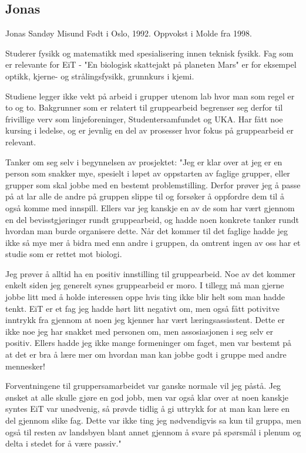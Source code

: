 \subsection*{Jonas}
Jonas Sandøy Misund
Født i Oslo, 1992.
Oppvokst i Molde fra 1998.

Studerer fysikk og matematikk med spesialisering innen teknisk fysikk.
Fag som er relevante for EiT - "En biologisk skattejakt på planeten Mars" er for eksempel optikk, kjerne- og strålingsfysikk, grunnkurs i kjemi.

Studiene legger ikke vekt på arbeid i grupper utenom lab hvor man som regel er to og to.
Bakgrunner som er relatert til gruppearbeid begrenser seg derfor til frivillige verv som linjeforeninger, Studentersamfundet og UKA.
Har fått noe kursing i ledelse, og er jevnlig en del av prosesser hvor fokus på gruppearbeid er relevant.

Tanker om seg selv i begynnelsen av prosjektet:
"Jeg er klar over at jeg er en person som snakker mye, spesielt i løpet av oppstarten av faglige grupper, eller grupper som skal jobbe med en bestemt problemstilling.
Derfor prøver jeg å passe på at lar alle de andre på gruppen slippe til og forsøker å oppfordre dem til å også komme med innspill.
Ellers var jeg kanskje en av de som har vært gjennom en del bevisstgjøringer rundt gruppearbeid, og hadde noen konkrete tanker rundt hvordan man burde organisere dette.
Når det kommer til det faglige hadde jeg ikke så mye mer å bidra med enn andre i gruppen, da omtrent ingen av oss har et studie som er rettet mot biologi.

Jeg prøver å alltid ha en positiv innstilling til gruppearbeid.
Noe av det kommer enkelt siden jeg generelt synes gruppearbeid er moro.
I tillegg må man gjerne jobbe litt med å holde interessen oppe hvis ting ikke blir helt som man hadde tenkt.
EiT er et fag jeg hadde hørt litt negativt om, men også fått potivitve inntrykk fra gjennom at noen jeg kjenner har vært læringsassisstent.
Dette er ikke noe jeg har snakket med personen om, men assosiasjonen i seg selv er positiv.
Ellers hadde jeg ikke mange formeninger om faget, men var bestemt på at det er bra å lære mer om hvordan man kan jobbe godt i gruppe med andre mennesker!

Forventningene til gruppersamarbeidet var ganske normale vil jeg påstå.
Jeg ønsket at alle skulle gjøre en god jobb, men var også klar over at noen kanskje syntes EiT var unødvenig, så prøvde tidlig å gi uttrykk for at man kan lære en del gjennom slike fag.
Dette var ikke ting jeg nødvendigvis sa kun til gruppa, men også til resten av landsbyen blant annet gjennom å svare på spørsmål i plenum og delta i stedet for å være passiv."